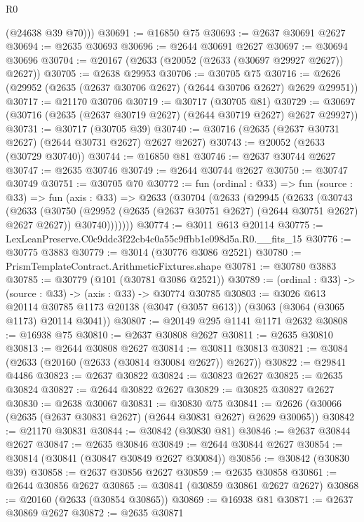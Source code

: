 \begin{lexlean}{R0}
\begin{coremodule}
        (@24638 @39 @70)))
@30691 := @16850 @75
@30693 := @2637 @30691 @2627
@30694 := @2635 @30693
@30696 := @2644 @30691 @2627
@30697 := @30694 @30696
@30704 := @20167 (@2633 (@20052 (@2633 (@30697 @29927 @2627)) @2627))
@30705 := @2638 @29953
@30706 := @30705 @75
@30716 := @2626 (@29952 (@2635 (@2637 @30706 @2627) (@2644 @30706 @2627) @2629 @29951))
@30717 := @21170 @30706
@30719 := @30717 (@30705 @81)
@30729 := @30697 (@30716 (@2635 (@2637 @30719 @2627) (@2644 @30719 @2627) @2627 @29927))
@30731 := @30717 (@30705 @39)
@30740 := @30716 (@2635 (@2637 @30731 @2627) (@2644 @30731 @2627) @2627 @2627)
@30743 := @20052 (@2633 (@30729 @30740))
@30744 := @16850 @81
@30746 := @2637 @30744 @2627
@30747 := @2635 @30746
@30749 := @2644 @30744 @2627
@30750 := @30747 @30749
@30751 := @30705 @70
@30772 := fun (ordinal : @33) =>
  fun (source : @33) =>
  fun (axis : @33) =>
  @2633
    (@30704
      (@2633
        (@29945
          (@2633
            (@30743
              (@2633
                (@30750
                  (@29952 (@2635 (@2637 @30751 @2627) (@2644 @30751 @2627) @2627 @2627))
                  @30740)))))))
@30774 := @3011 @613 @20114
@30775 := LexLeanPreserve.C0c9ddc3f22cb4c0a55c9ffbb1e098d5a.R0.__fits_15
@30776 := @30775 @3883
@30779 := @3014 (@30776 @3086 @2521)
@30780 := PrismTemplateContract.ArithmeticFixtures.shape
@30781 := @30780 @3883
@30785 := @30779 (@101 (@30781 @3086 @2521))
@30789 := (ordinal : @33) -> (source : @33) -> (axis : @33) -> @30774 @30785
@30803 := @3026
    @613
    @20114
    @30785
    @1173
    @20138
    (@3047 (@3057 @613))
    (@3063 (@3064 (@3065 @1173) @20114 @3041))
@30807 := @20149 @295 @1141 @1171 @2632
@30808 := @16938 @75
@30810 := @2637 @30808 @2627
@30811 := @2635 @30810
@30813 := @2644 @30808 @2627
@30814 := @30811 @30813
@30821 := @3084 (@2633 (@20160 (@2633 (@30814 @30084 @2627)) @2627))
@30822 := @29841 @4486
@30823 := @2637 @30822
@30824 := @30823 @2627
@30825 := @2635 @30824
@30827 := @2644 @30822 @2627
@30829 := @30825 @30827 @2627
@30830 := @2638 @30067
@30831 := @30830 @75
@30841 := @2626 (@30066 (@2635 (@2637 @30831 @2627) (@2644 @30831 @2627) @2629 @30065))
@30842 := @21170 @30831
@30844 := @30842 (@30830 @81)
@30846 := @2637 @30844 @2627
@30847 := @2635 @30846
@30849 := @2644 @30844 @2627
@30854 := @30814 (@30841 (@30847 @30849 @2627 @30084))
@30856 := @30842 (@30830 @39)
@30858 := @2637 @30856 @2627
@30859 := @2635 @30858
@30861 := @2644 @30856 @2627
@30865 := @30841 (@30859 @30861 @2627 @2627)
@30868 := @20160 (@2633 (@30854 @30865))
@30869 := @16938 @81
@30871 := @2637 @30869 @2627
@30872 := @2635 @30871

\end{coremodule}
\end{lexlean}
